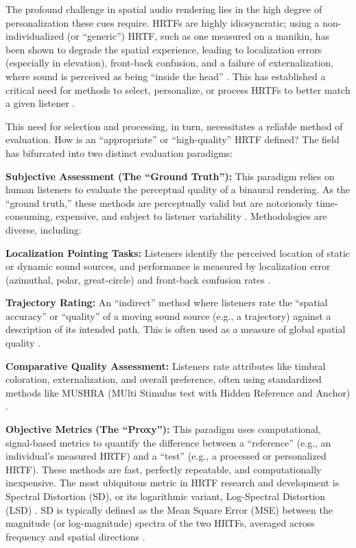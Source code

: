 \documentclass[12pt,a4paper]{article}
\begin{document}
The profound challenge in spatial audio rendering lies in the high degree of personalization these cues require. HRTFs are highly idiosyncratic; using a non-individualized (or ``generic'') HRTF, such as one measured on a manikin, has been shown to degrade the spatial experience, leading to localization errors (especially in elevation), front-back confusion, and a failure of externalization, where sound is perceived as being ``inside the head'' \cite{asaudio2025}. This has established a critical need for methods to select, personalize, or process HRTFs to better match a given listener \cite{andreopoulou2022}.

This need for selection and processing, in turn, necessitates a reliable method of evaluation. How is an ``appropriate'' or ``high-quality'' HRTF defined? The field has bifurcated into two distinct evaluation paradigms:

\textbf{Subjective Assessment (The ``Ground Truth''):} This paradigm relies on human listeners to evaluate the perceptual quality of a binaural rendering. As the ``ground truth,'' these methods are perceptually valid but are notoriously time-consuming, expensive, and subject to listener variability \cite{andreopoulou_icmc2014}. Methodologies are diverse, including:

\textbf{Localization Pointing Tasks:} Listeners identify the perceived location of static or dynamic sound sources, and performance is measured by localization error (azimuthal, polar, great-circle) and front-back confusion rates \cite{zhang2025}.

\textbf{Trajectory Rating:} An ``indirect'' method where listeners rate the ``spatial accuracy'' or ``quality'' of a moving sound source (e.g., a trajectory) against a description of its intended path. This is often used as a measure of global spatial quality \cite{andreopoulou2022}.

\textbf{Comparative Quality Assessment:} Listeners rate attributes like timbral coloration, externalization, and overall preference, often using standardized methods like MUSHRA (MUlti Stimulus test with Hidden Reference and Anchor) \cite{itu2015}.

\textbf{Objective Metrics (The ``Proxy''):} This paradigm uses computational, signal-based metrics to quantify the difference between a ``reference'' (e.g., an individual's measured HRTF) and a ``test'' (e.g., a processed or personalized HRTF). These methods are fast, perfectly repeatable, and computationally inexpensive. The most ubiquitous metric in HRTF research and development is Spectral Distortion (SD), or its logarithmic variant, Log-Spectral Distortion (LSD) \cite{hrtf_measure_review2020}. SD is typically defined as the Mean Square Error (MSE) between the magnitude (or log-magnitude) spectra of the two HRTFs, averaged across frequency and spatial directions \cite{hrtf_measure_review2020}.
\end{document}
